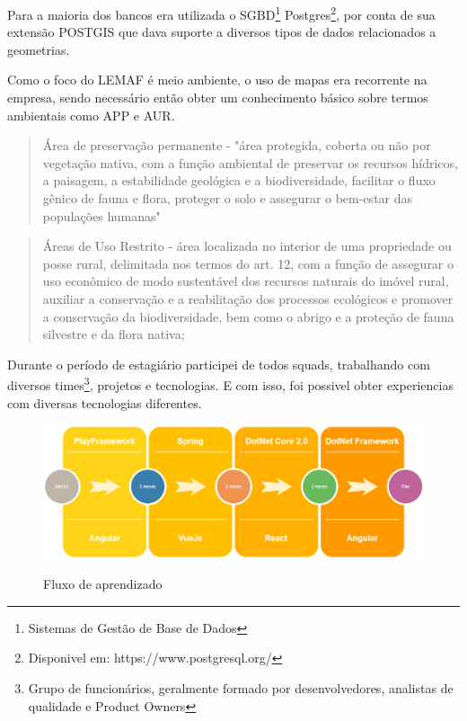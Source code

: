 Para a maioria dos bancos era utilizada o SGBD\footnote{ Sistemas de Gestão de Base de Dados} Postgres\footnote{Disponivel em: https://www.postgresql.org/}, por conta de sua extensão POSTGIS que dava suporte a diversos tipos de dados relacionados a geometrias.

Como o foco do LEMAF é meio ambiente, o uso de mapas era recorrente na empresa, sendo necessário então obter um conhecimento básico sobre termos ambientais como APP e AUR.

\begin{quote}
    Área de preservação permanente - "área protegida, coberta ou não por vegetação nativa, com a função ambiental de preservar os recursos hídricos, a paisagem, a estabilidade geológica e a biodiversidade, facilitar o fluxo gênico de fauna e flora, proteger o solo e assegurar o bem-estar das populações humanas"\cite{brasil2012}
\end{quote}

\begin{quote}
    Áreas de Uso Restrito -  área localizada no interior de uma propriedade ou posse rural, delimitada nos termos do art. 12, com a função de assegurar o uso econômico de modo sustentável dos recursos naturais do imóvel rural, auxiliar a conservação e a reabilitação dos processos ecológicos e promover a conservação da biodiversidade, bem como o abrigo e a proteção de fauna silvestre e da flora nativa;
\cite{brasil2012}

\end{quote}

Durante o período de estagiário participei de todos squads, trabalhando com diversos times\footnote{Grupo de funcionários, geralmente formado por desenvolvedores, analistas de qualidade e Product Owners}, projetos e tecnologias.
E com isso, foi possivel obter experiencias com diversas tecnologias diferentes.
\begin{figure}[H]
\centering
\caption{Fluxo de aprendizado} %
\includegraphics[scale=0.35]{fluxoAprendizado}\\  %
\label{fig:exemplo} %
\end{figure}

